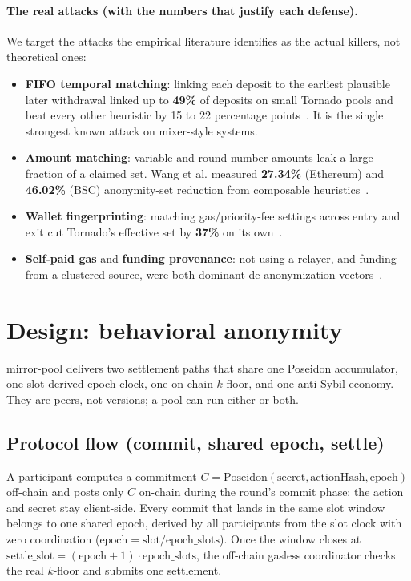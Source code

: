 \documentclass[10pt]{article}
\begin{document}
\paragraph{The real attacks (with the numbers that justify each defense).} We
target the attacks the empirical literature identifies as the actual killers, not
theoretical ones:
\begin{itemize}[leftmargin=1.4em,itemsep=0.12em]
  \item \textbf{FIFO temporal matching}: linking each deposit to the earliest
        plausible later withdrawal linked up to \textbf{49\%} of deposits on
        small Tornado pools and beat every other heuristic by 15 to 22
        percentage points~\cite{tornado}. It is the single strongest known attack
        on mixer-style systems.
  \item \textbf{Amount matching}: variable and round-number amounts leak a large
        fraction of a claimed set. Wang et al. measured \textbf{27.34\%}
        (Ethereum) and \textbf{46.02\%} (BSC) anonymity-set reduction from
        composable heuristics~\cite{wang}.
  \item \textbf{Wallet fingerprinting}: matching gas/priority-fee settings across
        entry and exit cut Tornado's effective set by \textbf{37\%} on its
        own~\cite{tornado}.
  \item \textbf{Self-paid gas} and \textbf{funding provenance}: not using a
        relayer, and funding from a clustered source, were both dominant
        de-anonymization vectors~\cite{tornado}.
\end{itemize}

\section{Design: behavioral anonymity}
\label{sec:design}

mirror-pool delivers two settlement paths that share one Poseidon accumulator,
one slot-derived epoch clock, one on-chain $k$-floor, and one anti-Sybil economy.
They are peers, not versions; a pool can run either or both.

\subsection{Protocol flow (commit, shared epoch, settle)}

A participant computes a commitment $C = \text{Poseidon}(\text{secret},
\text{actionHash}, \text{epoch})$ off-chain and posts only $C$ on-chain during the
round's commit phase; the action and secret stay client-side. Every commit that
lands in the same slot window belongs to one shared epoch, derived by all
participants from the slot clock with zero coordination
($\text{epoch} = \text{slot} / \text{epoch\_slots}$). Once the window closes at
$\text{settle\_slot} = (\text{epoch}{+}1)\cdot\text{epoch\_slots}$, the off-chain
gasless coordinator checks the real $k$-floor and submits one settlement.
\end{document}
